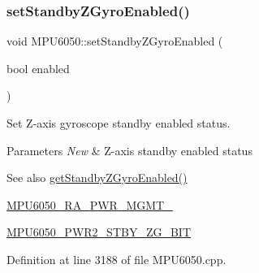 \begin{DoxyCode}{0}

\end{DoxyCode}
\mbox{\label{classMPU6050_ada7c8a873fe157703dcdc08e25b48e32}} 
\subsubsection{\texorpdfstring{setStandbyZGyroEnabled()}{setStandbyZGyroEnabled()}}
{\footnotesize\ttfamily void M\+P\+U6050\+::set\+Standby\+Z\+Gyro\+Enabled (\begin{DoxyParamCaption}\item[{bool}]{enabled }\end{DoxyParamCaption})}

Set Z-\/axis gyroscope standby enabled status. 
\begin{DoxyParams}{Parameters}
{\em New} & Z-\/axis standby enabled status \\
\hline
\end{DoxyParams}
\begin{DoxySeeAlso}{See also}
\mbox{\hyperlink{classMPU6050_a20f7804db1a980a3c425ae44c33d420b}{get\+Standby\+Z\+Gyro\+Enabled()}} 

\mbox{\hyperlink{MPU6050_8h_aace6ce286da4d5f8c8f5ba6f80688e13}{M\+P\+U6050\+\_\+\+R\+A\+\_\+\+P\+W\+R\+\_\+\+M\+G\+M\+T\+\_}} 

\mbox{\hyperlink{MPU6050_8h_a6da4d8df0e058732364f3353c30527c5}{M\+P\+U6050\+\_\+\+P\+W\+R2\+\_\+\+S\+T\+B\+Y\+\_\+\+Z\+G\+\_\+\+B\+IT}} 
\end{DoxySeeAlso}


Definition at line 3188 of file M\+P\+U6050.\+cpp.


